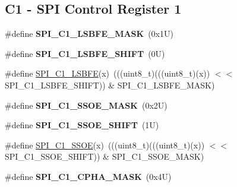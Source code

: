 \subsection*{C1 -\/ S\+PI Control Register 1}
\begin{DoxyCompactItemize}
\item 
\mbox{\label{group___s_p_i___register___masks_ga45f4cb42020607c9ed927bf57cc0ee31}} 
\#define {\bfseries S\+P\+I\+\_\+\+C1\+\_\+\+L\+S\+B\+F\+E\+\_\+\+M\+A\+SK}~(0x1\+U)
\item 
\mbox{\label{group___s_p_i___register___masks_gaa81af414d42c393342df48ae8d44c27f}} 
\#define {\bfseries S\+P\+I\+\_\+\+C1\+\_\+\+L\+S\+B\+F\+E\+\_\+\+S\+H\+I\+FT}~(0\+U)
\item 
\#define \mbox{\hyperlink{group___s_p_i___register___masks_gadfafbdc3b4a973a491aa48c02a3e2ced}{S\+P\+I\+\_\+\+C1\+\_\+\+L\+S\+B\+FE}}(x)~(((uint8\+\_\+t)(((uint8\+\_\+t)(x)) $<$$<$ S\+P\+I\+\_\+\+C1\+\_\+\+L\+S\+B\+F\+E\+\_\+\+S\+H\+I\+FT)) \& S\+P\+I\+\_\+\+C1\+\_\+\+L\+S\+B\+F\+E\+\_\+\+M\+A\+SK)
\item 
\mbox{\label{group___s_p_i___register___masks_ga18d4e12a34e268e98cf29ef47ff46e21}} 
\#define {\bfseries S\+P\+I\+\_\+\+C1\+\_\+\+S\+S\+O\+E\+\_\+\+M\+A\+SK}~(0x2\+U)
\item 
\mbox{\label{group___s_p_i___register___masks_gaa5941a1db540652e8da7f3881eb39384}} 
\#define {\bfseries S\+P\+I\+\_\+\+C1\+\_\+\+S\+S\+O\+E\+\_\+\+S\+H\+I\+FT}~(1\+U)
\item 
\#define \mbox{\hyperlink{group___s_p_i___register___masks_gac39a4574c6d0db672ce932490a5bd0da}{S\+P\+I\+\_\+\+C1\+\_\+\+S\+S\+OE}}(x)~(((uint8\+\_\+t)(((uint8\+\_\+t)(x)) $<$$<$ S\+P\+I\+\_\+\+C1\+\_\+\+S\+S\+O\+E\+\_\+\+S\+H\+I\+FT)) \& S\+P\+I\+\_\+\+C1\+\_\+\+S\+S\+O\+E\+\_\+\+M\+A\+SK)
\item 
\mbox{\label{group___s_p_i___register___masks_gaaf85a831465f0f4f302657b32171f2e6}} 
\#define {\bfseries S\+P\+I\+\_\+\+C1\+\_\+\+C\+P\+H\+A\+\_\+\+M\+A\+SK}~(0x4\+U)
\item 
\mbox{\label{group___s_p_i___register___masks_gaa305ee06e9cb66ad7ba9aed297debef3}} 

\end{DoxyCompactItemize}
